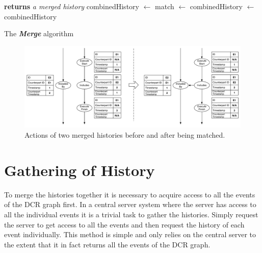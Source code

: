 	\begin{algorithm}
		\begin{algorithmic}
			 \textbf{returns} \textit{a merged history}
			\State combinedHistory $\leftarrow$ 
			\State match $\leftarrow$ 
			\State combinedHistory $\leftarrow$ 
			\EndIf
			\EndIf
			\EndFor
			\State\Return combinedHistory
			\EndFunction
		\end{algorithmic}
		\caption{The \textit{\textbf{Merge}} algorithm}
		\label{alg:merge}
	\end{algorithm}
	
	\begin{figure}[H]
		\centering
		\includegraphics[width=\textwidth]{4connect/images/match-before-after.pdf}
		\caption{Actions of two merged histories before and after being matched.}
		\label{fig:connecting:match-before-after}
	\end{figure}
	
    
    \section{Gathering of History}
   
    To merge the histories together it is necessary to acquire access  to all the events of the DCR graph first. In a central server system where the server has access to all the individual events it is a trivial task to gather the histories. Simply request the server to get access to all the events and then request the history of each event individually. This method is simple and only relies on the central server to the extent that it in fact returns all the events of the DCR graph. 
    

